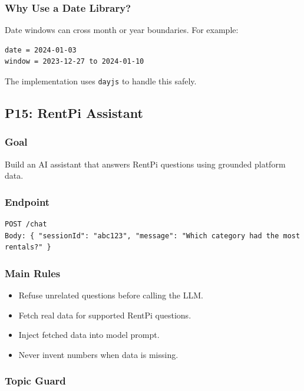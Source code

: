 \documentclass[11pt,a4paper]{article}
\begin{document}
\subsubsection*{Why Use a Date Library?}

Date windows can cross month or year boundaries. For example:

\begin{lstlisting}
date = 2024-01-03
window = 2023-12-27 to 2024-01-10
\end{lstlisting}

The implementation uses \texttt{dayjs} to handle this safely.

\subsection{P15: RentPi Assistant}

\subsubsection*{Goal}
Build an AI assistant that answers RentPi questions using grounded platform data.

\subsubsection*{Endpoint}

\begin{lstlisting}
POST /chat
Body: { "sessionId": "abc123", "message": "Which category had the most rentals?" }
\end{lstlisting}

\subsubsection*{Main Rules}

\begin{itemize}
  \item Refuse unrelated questions before calling the LLM.
  \item Fetch real data for supported RentPi questions.
  \item Inject fetched data into model prompt.
  \item Never invent numbers when data is missing.
\end{itemize}

\subsubsection*{Topic Guard}
\end{document}
